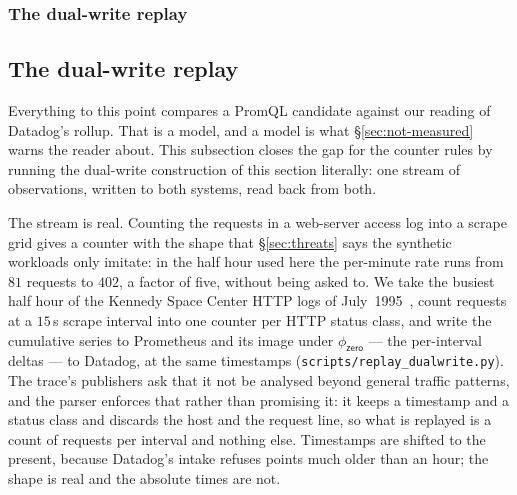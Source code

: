 \iffull\subsubsection{The dual-write replay}\else\subsection{The dual-write replay}\fi
\label{sec:replay}

Everything to this point compares a PromQL candidate against our reading of Datadog's
rollup. That is a model, and a model is what \S\ref{sec:not-measured} warns the reader
about. This subsection closes the gap for the counter rules by running the dual-write
construction of this section literally: one stream of observations, written to both
systems, read back from both.

The stream is real. Counting the requests in a web-server access log into a scrape grid
gives a counter with the shape that \S\ref{sec:threats} says the synthetic workloads only
imitate: in the half hour used here the per-minute rate runs from $81$ requests to
$402$, a factor of five, without
being asked to. We take the busiest half hour of the Kennedy Space Center HTTP logs of
July~1995~\citep{nasahttp}, count requests at a $15$\,s scrape interval into one counter
per HTTP status class, and write the cumulative series to Prometheus and its image under
$\phi_{\mathsf{zero}}$ --- the per-interval deltas --- to Datadog, at the same timestamps
(\texttt{scripts\slash replay\_dualwrite.py}).
The trace's publishers ask that it not be analysed beyond general traffic patterns, and
the parser enforces that rather than promising it: it keeps a timestamp and a status
class and discards the host and the request line, so what is replayed is a count of
requests per interval and nothing else. Timestamps are shifted to the present, because
Datadog's intake refuses points much older than an hour; the shape is real and the
absolute times are not.

\begin{table}[htbp]\centering\footnotesize

\caption{The dual-write replay: each candidate against \emph{Datadog}, bucket by bucket,
on a real request trace. \emph{Max $d$} is over the inside instant; on the edge the
aligned rows disagree by construction and the convention rather than the arithmetic
is what they measure. ``Inside'' and ``on the edge'' are the two evaluation instants
of Remark~\ref{rem:closure}. $84$ comparisons per row.}
\label{tab:replay}
\end{table}

